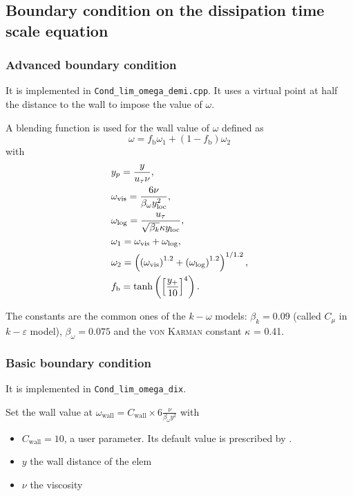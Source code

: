 \subsection{Boundary condition on the dissipation time scale equation}

\subsubsection{Advanced boundary condition}

It is implemented in \texttt{Cond\_lim\_omega\_demi.cpp}. It uses a virtual point at half the distance to the wall to impose the value of $\omega$.

A blending function is used for the wall value of $\omega$ defined as
\begin{equation}
    \omega = f_{\text{b}} \omega_1 + (1-f_{\text{b}})\omega_2
\end{equation}
with
\begin{align}
    &y_p = \frac{y}{u_{\tau}{\nu}},\\
    &\omega_{\text{vis}} = \frac{6\nu}{\beta_{\omega}y_{\text{loc}}^2},\\
    &\omega_{\text{log}} = \frac{u_{\tau}}{\sqrt{\beta_k}\kappa y_{\text{loc}}},\\
    &\omega_1 = \omega_{\text{vis}} + \omega_{\text{log}},\\
    &\omega_2 = \left( \left( \omega_{\text{vis}} \right)^{1.2} + \left( \omega_{\text{log}} \right)^{1.2} \right)^{1/1.2},\\
    &f_{\text{b}} = \text{tanh}\left( \left[ \frac{y_+}{10} \right]^4 \right).
\end{align}

The constants are the common ones of the $k-\omega$ models: $\beta_k = 0.09$ (called $C_{\mu}$ in $k-\varepsilon$ model), $\beta_{\omega} = 0.075$ and the \textsc{von Karman} constant $\kappa$ = 0.41.

\subsubsection{Basic boundary condition}
It is implemented in \texttt{Cond\_lim\_omega\_dix}.

Set the wall value at $\omega_{\text{wall}} = C_{\text{wall}} \times 6\frac{\nu}{\beta_{\omega}y^2}$
with
\begin{itemize}
    \item $C_{\text{wall}} = 10$, a user parameter. Its default value is prescribed by \cite{Wilcox2008}.
    \item $y$ the wall distance of the elem
    \item $\nu$ the viscosity
\end{itemize}



